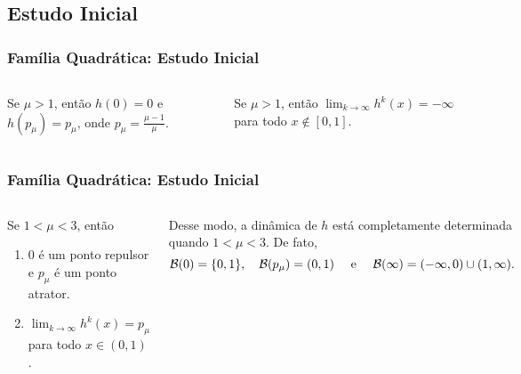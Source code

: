 \subsection{Estudo Inicial}

\begin{frame}
\vspace{5pt}
\frametitle{Família Quadrática: Estudo Inicial}
\begin{columns}
\column{\dimexpr\paperwidth-15pt}

\begin{proposition}
Se $\mu > 1$, então $h(0) = 0$ e $h(p_\mu) = p_\mu$, onde $p_\mu = \frac{\mu-1}{\mu}$.
\end{proposition}

\begin{proposition}
Se $\mu > 1$, então $\lim_{k \to \infty} h^k(x) = - \infty$ para todo $x \notin [0, 1]$.
\end{proposition}

\end{columns}
\end{frame}


\begin{frame}
\vspace{5pt}
\frametitle{Família Quadrática: Estudo Inicial}
\begin{columns}
\column{\dimexpr\paperwidth-15pt}

\begin{proposition}
Se $1 < \mu < 3$, então
\begin{enumerate}
\item $0$ é um ponto repulsor e $p_\mu$ é um ponto atrator.
\item $\lim_{k \to \infty} h^k(x) = p_\mu$ para todo $x \in (0, 1)$.
\end{enumerate}
\end{proposition}

Desse modo, a dinâmica de $h$ está completamente determinada quando $1 < \mu < 3$. De fato,
$$\mathcal{B}(0) = \lbrace 0, 1 \rbrace, \quad \mathcal{B}(p_\mu) = (0, 1) \quad \text{ e } \quad \mathcal{B}(\infty) = (-\infty, 0) \cup (1, \infty).$$

\end{columns}
\end{frame}
